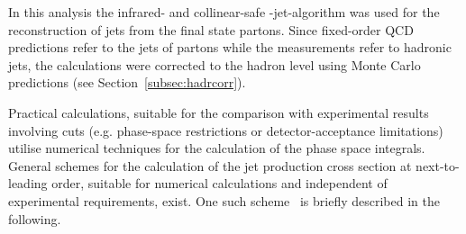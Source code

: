 In this analysis the infrared- and collinear-safe \kt-jet-algorithm was used for the reconstruction of jets from the final state partons. Since fixed-order QCD predictions refer to the jets of partons while the measurements refer to hadronic jets, the calculations were corrected to the hadron level using Monte Carlo predictions (see Section~\ref{subsec:hadrcorr}).

Practical calculations, suitable for the comparison with experimental results involving cuts (e.g. phase-space restrictions or detector-acceptance limitations) utilise numerical techniques for the calculation of the phase space integrals. General schemes for the calculation of the jet production cross section at next-to-leading order, suitable for numerical calculations and independent of experimental requirements, exist. One such scheme~\cite{Catani:1996vz} is briefly described in the following. 